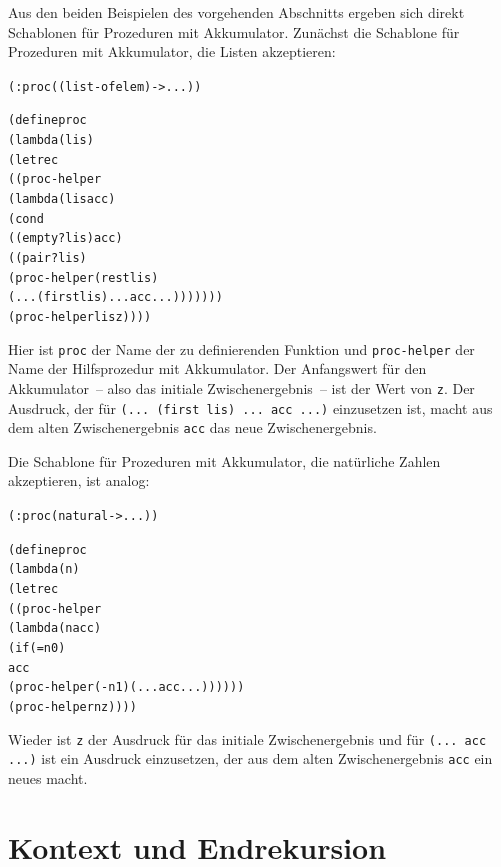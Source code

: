 Aus den beiden Beispielen des vorgehenden Abschnitts ergeben sich
direkt Schablonen für Prozeduren mit Akkumulator.  Zunächst die
Schablone für Prozeduren mit Akkumulator, die Listen akzeptieren:
%
\begin{alltt}
(: proc ((list-of elem) -> ...))

(define proc
  (lambda (lis)
    (letrec
       ((proc-helper
         (lambda (lis acc)
            (cond
              ((empty? lis) acc)
              ((pair? lis)
                 (proc-helper (rest lis)
                    (... (first lis) ... acc ...)))))))
    (proc-helper lis z))))
\end{alltt}
%
Hier ist \texttt{proc} der Name der zu definierenden Funktion
und \texttt{proc-helper} der Name der Hilfsprozedur mit
Akkumulator.  Der Anfangswert für den Akkumulator~-- also das initiale
Zwischenergebnis~-- ist der Wert von \texttt{z}.  Der
Ausdruck, der für \texttt{(... (first lis) ... acc ...)} einzusetzen
ist, macht aus dem alten Zwischenergebnis \texttt{acc} das neue
Zwischenergebnis.

Die Schablone für Prozeduren mit Akkumulator, die natürliche Zahlen
akzeptieren, ist analog:
%
\begin{alltt}
(: proc (natural -> ...))

(define proc
  (lambda (n)
    (letrec
      ((proc-helper
        (lambda (n acc)
          (if (= n 0)
              acc
              (proc-helper (- n 1) (... acc ...))))))
    (proc-helper n z))))
\end{alltt}
%
Wieder ist \texttt{z} der Ausdruck für das initiale Zwischenergebnis
und für \texttt{(... acc ...)} ist ein Ausdruck einzusetzen, der aus
dem alten Zwischenergebnis \texttt{acc} ein neues macht.

\section{Kontext und Endrekursion}
\label{sec:iteration}

